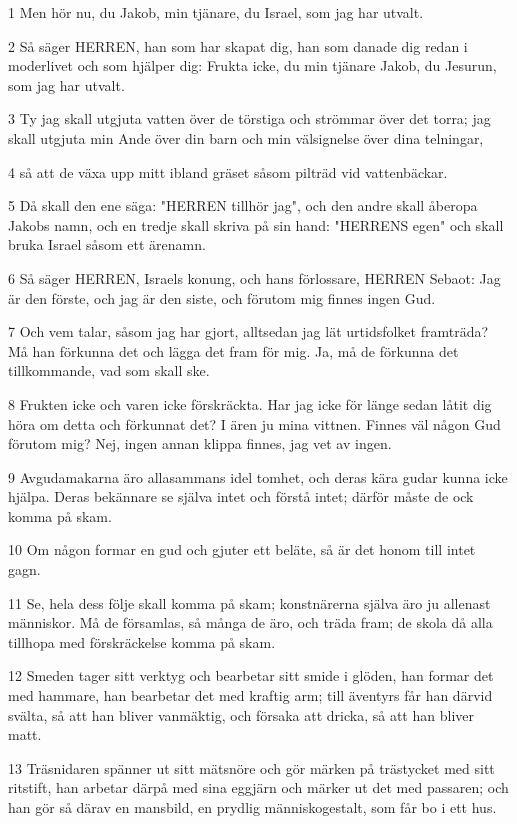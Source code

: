 \par 1 Men hör nu, du Jakob, min tjänare, du Israel, som jag har utvalt.
\par 2 Så säger HERREN, han som har skapat dig, han som danade dig redan i moderlivet och som hjälper dig: Frukta icke, du min tjänare Jakob, du Jesurun, som jag har utvalt.
\par 3 Ty jag skall utgjuta vatten över de törstiga och strömmar över det torra; jag skall utgjuta min Ande över din barn och min välsignelse över dina telningar,
\par 4 så att de växa upp mitt ibland gräset såsom pilträd vid vattenbäckar.
\par 5 Då skall den ene säga: "HERREN tillhör jag", och den andre skall åberopa Jakobs namn, och en tredje skall skriva på sin hand: "HERRENS egen" och skall bruka Israel såsom ett ärenamn.
\par 6 Så säger HERREN, Israels konung, och hans förlossare, HERREN Sebaot: Jag är den förste, och jag är den siste, och förutom mig finnes ingen Gud.
\par 7 Och vem talar, såsom jag har gjort, alltsedan jag lät urtidsfolket framträda? Må han förkunna det och lägga det fram för mig. Ja, må de förkunna det tillkommande, vad som skall ske.
\par 8 Frukten icke och varen icke förskräckta. Har jag icke för länge sedan låtit dig höra om detta och förkunnat det? I ären ju mina vittnen. Finnes väl någon Gud förutom mig? Nej, ingen annan klippa finnes, jag vet av ingen.
\par 9 Avgudamakarna äro allasammans idel tomhet, och deras kära gudar kunna icke hjälpa. Deras bekännare se själva intet och förstå intet; därför måste de ock komma på skam.
\par 10 Om någon formar en gud och gjuter ett beläte, så är det honom till intet gagn.
\par 11 Se, hela dess följe skall komma på skam; konstnärerna själva äro ju allenast människor. Må de församlas, så många de äro, och träda fram; de skola då alla tillhopa med förskräckelse komma på skam.
\par 12 Smeden tager sitt verktyg och bearbetar sitt smide i glöden, han formar det med hammare, han bearbetar det med kraftig arm; till äventyrs får han därvid svälta, så att han bliver vanmäktig, och försaka att dricka, så att han bliver matt.
\par 13 Träsnidaren spänner ut sitt mätsnöre och gör märken på trästycket med sitt ritstift, han arbetar därpå med sina eggjärn och märker ut det med passaren; och han gör så därav en mansbild, en prydlig människogestalt, som får bo i ett hus.
